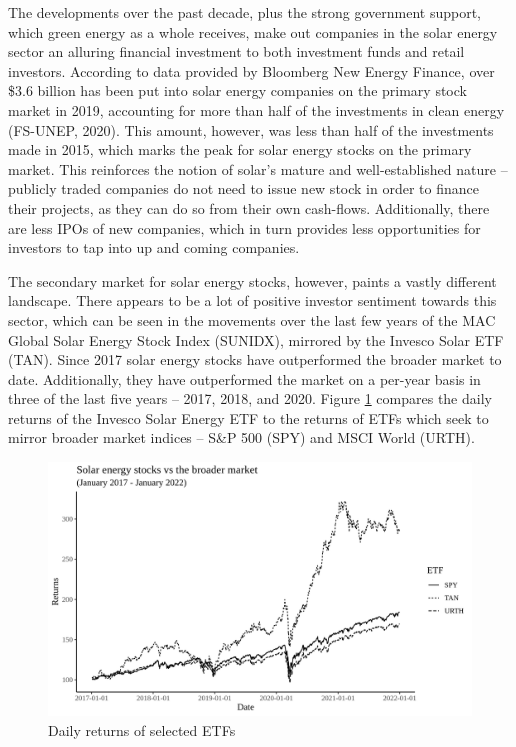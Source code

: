 \documentclass[11pt]{article}
\begin{document}
The developments over the past decade, plus the strong government support, which green energy as a whole receives, make out companies in the solar energy sector an alluring financial investment to both investment funds and retail investors. According to data provided by Bloomberg New Energy Finance, over \$3.6 billion has been put into solar energy companies on the primary stock market in 2019, accounting for more than half of the investments in clean energy (FS-UNEP, 2020). This amount, however, was less than half of the investments made in 2015, which marks the peak for solar energy stocks on the primary market. This reinforces the notion of solar's mature and well-established nature -- publicly traded companies do not need to issue new stock in order to finance their projects, as they can do so from their own cash-flows. Additionally, there are less IPOs of new companies, which in turn provides less opportunities for investors to tap into up and coming companies.
\newline

The secondary market for solar energy stocks, however, paints a vastly different landscape. There appears to be a lot of positive investor sentiment towards this sector, which can be seen in the movements over the last few years of the MAC Global Solar Energy Stock Index (SUNIDX), mirrored by the Invesco Solar ETF (TAN). Since 2017 solar energy stocks have outperformed the broader market to date. Additionally, they have outperformed the market on a per-year basis in three of the last five years -- 2017, 2018, and 2020. Figure \ref{fig:clean_energy_stocks_vs_broader_market} compares the daily returns of the Invesco Solar Energy ETF to the returns of ETFs which seek to mirror broader market indices -- S\&P 500 (SPY) and MSCI World (URTH).
\newline

\begin{figure}[h]
    \centering
    \includegraphics[width = \textwidth]{Figures/Solar energy stocks vs the broader market.png}
    \caption{Daily returns of selected ETFs}
    \label{fig:clean_energy_stocks_vs_broader_market}
\end{figure}
\end{document}
